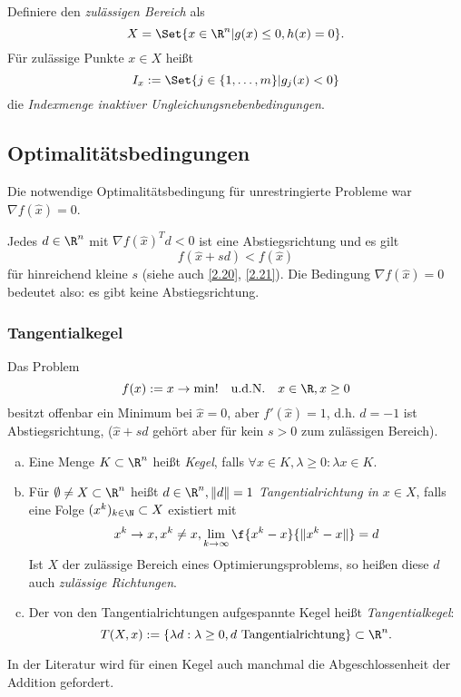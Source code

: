 \begin{df} \label{3.11}
	Definiere den \emph{zulässigen Bereich} als
	\[
		X = \Set{ x \in \R^n | g(x) \le 0, h(x) = 0 }.
	\]
	Für zulässige Punkte $x \in X$ heißt
	\[
		I_x := \Set{ j \in \{1, \dotsc, m\} | g_j(x) < 0 }
	\]
	die \emph{Indexmenge inaktiver Ungleichungsnebenbedingungen}.
\end{df}

\subsection{Optimalitätsbedingungen}

Die notwendige Optimalitätsbedingung für unrestringierte Probleme war $\nabla f(\hat x) = 0$.

Jedes $d \in \R^n$ mit $\nabla f(\hat x)^T d < 0$ ist eine Abstiegsrichtung und es gilt
\[
	f(\hat x + sd) < f(\hat x)
\]
für hinreichend kleine $s$ (siehe auch \ref{2.20}, \ref{2.21}).
Die Bedingung $\nabla f(\hat x) = 0$ bedeutet also: es gibt keine Abstiegsrichtung.

\subsubsection{Tangentialkegel}

\begin{ex} \label{3.12}
	Das Problem
	\[
		f(x) := x \to \min! \udN  x\in \R, x \ge 0
	\]
	besitzt offenbar ein Minimum bei $\hat x = 0$, aber $f'(\hat x) = 1$, d.h. $d = -1$ ist Abstiegsrichtung, ($\hat x + sd$ gehört aber für kein $s > 0$ zum zulässigen Bereich).
\end{ex}

\begin{df} \label{3.13}
	\begin{enumerate}[(a)]
		\item
			Eine Menge $K \subset \R^n$ heißt \emph{Kegel}, falls $\forall x \in K, \lambda \ge 0 : \lambda x \in K$.
		\item
			Für $\emptyset \neq X \subset \R^n$ heißt $d \in \R^n, \|d\| = 1$ \emph{Tangentialrichtung in $x \in X$}, falls eine Folge $(x^k)_{k\in\N} \subset X$ existiert mit
			\[
				x^k \to x, x^k \neq x, \lim_{k\to\infty} \f{x^k - x}{\|x^k-x\|} = d
			\]
			Ist $X$ der zulässige Bereich eines Optimierungsproblems, so heißen diese $d$ auch \emph{zulässige Richtungen}.
		\item
			Der von den Tangentialrichtungen aufgespannte Kegel heißt \emph{Tangentialkegel}:
			\[
				T(X, x) := \{ \lambda d : \lambda \ge 0, d \text{ Tangentialrichtung} \} \subset \R^n.
			\]
	\end{enumerate}
	\begin{note}
		In der Literatur wird für einen Kegel auch manchmal die Abgeschlossenheit der Addition gefordert.
	\end{note}
\end{df}

